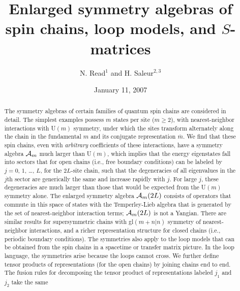 \documentclass[twocolumn,floats,pra]{revtex4}
\def \cA {{\cal A}}
\begin{document}



\title{Enlarged symmetry algebras of spin chains, loop models, and $S$-matrices}
\author{N. Read$^1$ and H. Saleur$^{2,3}$}
\date{January 11, 2007}




\begin{abstract}
The symmetry algebras of certain families of quantum spin chains
are considered in detail. The simplest examples possess $m$ states
per site ($m\geq2$), with nearest-neighbor interactions with
U$(m)$ symmetry, under which the sites transform alternately along
the chain in the fundamental $m$ and its conjugate representation
$\overline{m}$. We find that these spin chains, even with {\em
arbitrary} coefficients of these interactions, have a symmetry
algebra $\cA_m$ much larger than U$(m)$, which implies that the
energy eigenstates fall into sectors that for open chains (i.e.,
free boundary conditions) can be labeled by $j=0$, $1$, \ldots,
$L$, for the $2L$-site chain, such that the degeneracies of all
eigenvalues in the $j$th sector are generically the same and
increase rapidly with $j$. For large $j$, these degeneracies are
much larger than those that would be expected from the U$(m)$
symmetry alone. The enlarged symmetry algebra $\cA_m(2L)$ consists
of operators that commute in this space of states with the
Temperley-Lieb algebra that is generated by the set of
nearest-neighbor interaction terms; $\cA_m(2L)$ is not a Yangian.
There are similar results for supersymmetric chains with
gl$(m+n|n)$ symmetry of nearest-neighbor interactions, and a
richer representation structure for closed chains (i.e., periodic
boundary conditions). The symmetries also apply to the loop models
that can be obtained from the spin chains in a spacetime or
transfer matrix picture. In the loop language, the symmetries
arise because the loops cannot cross. We further define tensor
products of representations (for the open chains) by joining
chains end to end. The fusion rules for decomposing the tensor
product of representations labeled $j_1$ and $j_2$ take the same

\end{abstract}
\end{document}
